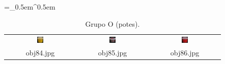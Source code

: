 \begin{table}[H]
  \centering
  \caption{Grupo O (potes).}
  \tabulinesep =_0.5em^0.5em
  \everyrow{\tabucline[0.4pt]-}
  \begin{tabu}{|ccc|}
    \includegraphics[width=0.1\textwidth,height=0.1\textwidth]{imagens/coil_100/potes/obj70__0.png} &
    \includegraphics[width=0.1\textwidth,height=0.1\textwidth]{imagens/coil_100/potes/obj72__0.png} &
    \includegraphics[width=0.1\textwidth,height=0.1\textwidth]{imagens/coil_100/potes/obj95__0.png}
    \\
    \scriptsize{obj84.jpg} & \scriptsize{obj85.jpg} & \scriptsize{obj86.jpg}
  \end{tabu}
\end{table}

